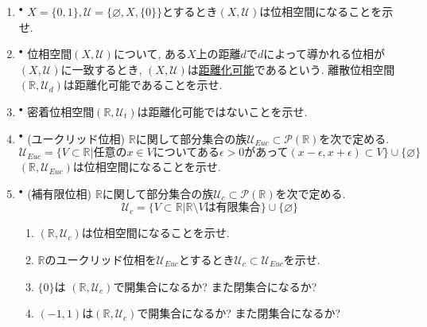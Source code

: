 \documentclass[dvipdfmx,a4paper,11pt]{article}
\newcommand{\R}{\mathbb{R}}
\newcommand{\Q}{\mathbb{Q}}
\theoremstyle{definition}
\begin{document}
\begin{enumerate}[label=\textbf{問}\ref*{sec-open}.\arabic*]
\setlength{\parskip}{0cm}
  \setlength{\itemsep}{7pt} 
\item $^\bullet$ $X = \{ 0,1\}, \mathscr{U} = \{ \varnothing, X, \{0\} \}$とするとき$(X, \mathscr{U})$は位相空間になることを示せ.

\item \label{discrete} $^\bullet$ 位相空間$(X, \mathscr{U})$について, ある$X$上の距離$d$で$d$によって導かれる位相が$(X, \mathscr{U})$に一致するとき,  $(X, \mathscr{U})$は\underline{距離化可能}であるという. 
離散位相空間$(\R, \mathscr{U}_d)$は距離化可能であることを示せ.
\item $^\bullet$\label{trivial} 密着位相空間$(\R, \mathscr{U}_t)$は距離化可能ではないことを示せ.
\item $^\bullet$ (ユークリッド位相) $\R$に関して部分集合の族$\mathscr{U}_{Euc} \subset \mathcal{P}(\R)$を次で定める.
$$
\mathscr{U}_{Euc}= \{V \subset \R | \text{任意の$x \in V$についてある$\epsilon >0$があって$(x - \epsilon, x+ \epsilon) \subset V$} \} \cup \{  \varnothing  \}
$$
$(\R,\mathscr{U}_{Euc})$は位相空間になることを示せ.

\item $^\bullet$ \label{cofinite}(補有限位相)
$\R$に関して部分集合の族$\mathscr{U}_c \subset \mathcal{P}(\R)$を次で定める.
$$
\mathscr{U}_c = \{V \subset \R | \text{$\R \setminus V$は有限集合} \} \cup \{  \varnothing  \}
$$
	\begin{enumerate}
	\setlength{\parskip}{0cm}
  	\setlength{\itemsep}{0pt} 
	\item $(\R,\mathscr{U}_c)$は位相空間になることを示せ.
	\item $\R$のユークリッド位相を$\mathscr{U}_{Euc}$とするとき$\mathscr{U}_c  \subset \mathscr{U}_{Euc}$を示せ. 
	\item $\{ 0\}$は $(\R,\mathscr{U}_{c} )$で開集合になるか? また閉集合になるか?
	\item $(-1,1)$は$(\R,\mathscr{U}_c)$で開集合になるか? また閉集合になるか?
	\end{enumerate}
	



\end{enumerate}
\end{document}

